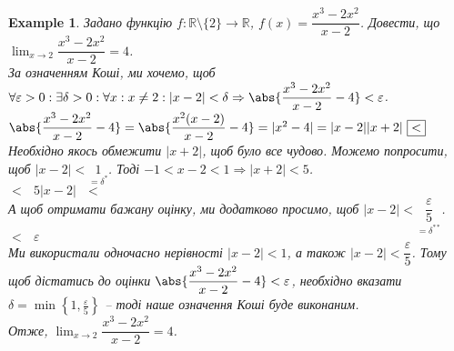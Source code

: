 \documentclass[a4paper, 14pt]{article}
\theoremstyle{theoremdd}
\theoremstyle{theoremdd}
\theoremstyle{theoremdd}
\theoremstyle{theoremdd}
\newtheorem{example}[theorem]{Example}
\theoremstyle{theoremdd}
\theoremstyle{theoremdd}
\theoremstyle{theoremdd}
\theoremstyle{theoremdd}
\begin{document}
	\begin{example}
	Задано функцію $f \colon \mathbb{R} \setminus \{2\} \to \mathbb{R}$, $f(x) = \dfrac{x^3-2x^2}{x-2}$. Довести, що $\displaystyle \lim_{x \to 2} \dfrac{x^3-2x^2}{x-2} = 4$.\\
	За означенням Коші, ми хочемо, щоб $\forall \varepsilon > 0: \exists \delta > 0: \forall x: x \neq 2: |x-2|<\delta \Rightarrow \abs{\dfrac{x^3-2x^2}{x-2} - 4} <\varepsilon$.
\\ \iffalse %
	\begin{figure} [H]
\centering
{
\begin{tikzpicture}[scale = 0.8]

\draw[thick, ->] (-1,0)--(4,0) node[anchor = north] {$x$};
\draw[thick, ->] (0,-1)--(0,6.5) node[anchor = east] {$y$};

\draw[thick, domain=-1:2.5, variable=\x] plot({\x}, {\x*\x}) node[anchor = west, scale = 0.7] {$f(x) = x^2$};
\draw (2 cm, 1pt) -- (2 cm, -1pt) node[anchor = north] {$2$};
\draw (1 pt, 4cm) -- (-1 pt, 4cm) node[anchor = east] {$4$};
\draw[thick, blue, dashed] (2.2,2.2*2.2)--(2.2,0) node[anchor = north west, scale=0.9] {$2+\delta$};
\draw[thick, blue, dashed] (1.8,1.8*1.8)--(1.8,0) node[anchor = north east, scale=0.9] {$2-\delta$};
\draw[thick, red, dashed] (1.8,1.8*1.8)--(0,1.8*1.8) node[anchor = east, scale=0.9] {$4-\varepsilon$};
\draw[thick, red, dashed] (2.2,2.2*2.2)--(0,2.2*2.2) node[anchor = east, scale=0.9] {$4+\varepsilon$};
\draw[thick, dashed] (2,0)--(2,4);
\draw[thick, dashed] (2,4)--(0,4);
\node[white] at (2,4) [circle,fill,inner sep=1.5pt, draw = black]{};

\end{tikzpicture}
}
\caption*{Наскільки ми б не відступали від $4$ по осі $OY$, ми завжди знайдемо окіл т. $2$ на осі $OX$.}
\end{figure}
\fi %
	$\abs{\dfrac{x^3-2x^2}{x-2} - 4} = \abs{\dfrac{x^2(x-2)}{x-2} - 4} = |x^2-4| = |x-2||x+2| \text{ } \boxed{<}$\\
	Необхідно якось обмежити $|x+2|$, щоб було все чудово. Можемо попросити, щоб $|x-2| < \underset{=\delta^*}{1}$. Тоді $-1<x-2<1 \Rightarrow |x+2|<5$.\\
	$\boxed{<} \text{ } 5|x-2| \text{ } \boxed{\boxed{<}}$\\
	А щоб отримати бажану оцінку, ми додатково просимо, щоб $|x-2| < \underset{=\delta^{**}}{\dfrac{\varepsilon}{5}}$.\\
	$\boxed{\boxed{<}} \text{ } \varepsilon$\\
	Ми використали одночасно нерівності $|x-2| < 1$, а також $|x-2| < \dfrac{\varepsilon}{5}$. Тому щоб дістатись до оцінки $\abs{\dfrac{x^3-2x^2}{x-2}-4}<\varepsilon$, необхідно вказати $\delta = \displaystyle \min \left\{1, \frac{\varepsilon}{5} \right\}$ -- тоді наше означення Коші буде виконаним.\\
	Отже, $\displaystyle\lim_{x \to 2} \dfrac{x^3-2x^2}{x-2} = 4$.
\end{example}
\end{document}
